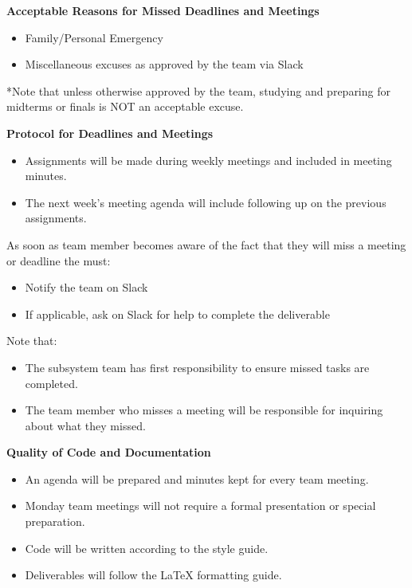 \textbf{Acceptable Reasons for Missed Deadlines and Meetings}

\begin{itemize}
\item Family/Personal Emergency
\item Miscellaneous excuses as approved by the team via Slack
\end{itemize}
*Note that unless otherwise approved by the team, studying and preparing for midterms or finals is NOT an acceptable excuse.

\textbf{Protocol for Deadlines and Meetings}

\begin{itemize}
\item Assignments will be made during weekly meetings and included in meeting minutes.
\item The next week’s meeting agenda will include following up on the previous assignments.
\end{itemize}

As soon as team member becomes aware of the fact that they will miss a meeting or deadline the must:

\begin{itemize}
\item Notify the team on Slack
\item If applicable, ask on Slack for help to complete the deliverable
\end{itemize}

Note that:

\begin{itemize}
\item The subsystem team has first responsibility to ensure missed tasks are completed.
\item The team member who misses a meeting will be responsible for inquiring about what they missed.
\end{itemize}

\textbf{Quality of Code and Documentation}

\begin{itemize}
\item An agenda will be prepared and minutes kept for every team meeting.
\item Monday team meetings will not require a formal presentation or special preparation.
\item Code will be written according to the style guide.
\item Deliverables will follow the LaTeX formatting guide.
\end{itemize}

